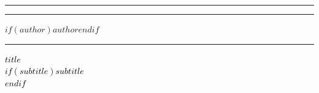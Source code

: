 %
%
%
% 


	\centering %
	
	
	\rule{\textwidth}{1pt} %
	
	\vspace{2pt}\vspace{-\baselineskip} %
	
	\rule{\textwidth}{0.4pt} %
	
	\vspace{0.1\textheight} %
	
	
	$if(author)${\Huge{$author$}}$endif$ %
	
	\vspace{0.05\textheight} %
	
	\rule{0.3\textwidth}{0.4pt} %
		
	
	\vspace{0.025\textheight} %

	\textcolor{black}{ %
		{\Huge{$title$}}\\[0.5\baselineskip] %
		$if(subtitle)${\Huge{$subtitle$}}\\[0.5\baselineskip]$endif$ %
	}
	
	\vfill %
	
	

